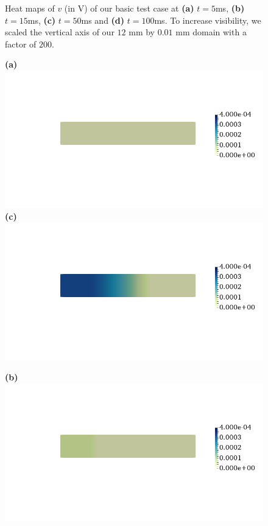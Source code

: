 \documentclass[12pt,a4paper]{article}
\begin{document}
\begin{figure}
\begin{minipage}{0.47\textwidth}
    \end{minipage}
    \caption{Heat maps of $v$ (in V) of our basic test case at \textbf{(a)} $t=5$ms, \textbf{(b)} $t=15$ms, \textbf{(c)} $t=50$ms and \textbf{(d)} $t=100$ms. To increase visibility, we scaled the vertical axis of our $12$ mm by $0.01$ mm domain with a factor of $200$.}
    \label{fig:1}
\end{figure}
%
\begin{figure}
\begin{minipage}{0.47\textwidth}
 \textbf{(a)} \includegraphics[trim=0cm 4cm 0cm 4cm, clip=true, width=0.9\linewidth]{c5}
      \textbf{(c)} \includegraphics[trim=0cm 4cm 0cm 4cm, clip=true, width=0.9\linewidth]{c100}
    \end{minipage}
    \begin{minipage}{0.47\textwidth}
  \textbf{(b)} \includegraphics[trim=0cm 4cm 0cm 4cm, clip=true, width=0.9\linewidth]{c15}

\end{minipage}
\end{figure}
\end{document}
